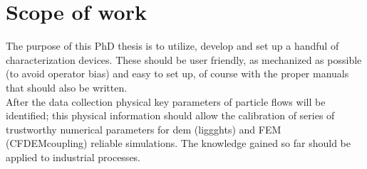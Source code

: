 
\section{Scope of work}
\label{sec:scopeofwork}

The purpose of this PhD thesis is to utilize, develop and set up a handful of characterization devices.
These should be user friendly, as mechanized as possible (to avoid operator bias) and easy to set up, of course with the proper manuals that should also be written.\\
After the data collection physical key parameters of particle flows will be identified; 
this physical information should allow the calibration of series of trustworthy numerical parameters for \ac{dem} (\ac{liggghts}) and FEM (CFDEMcoupling) reliable simulations.
The knowledge gained so far should be applied to industrial processes.\\

